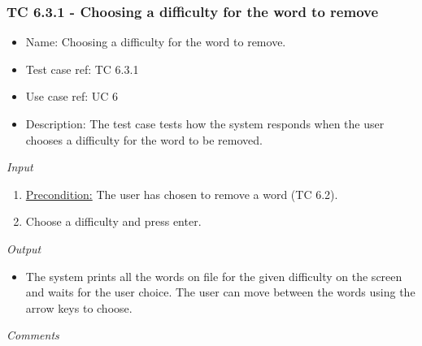 \documentclass[12pt, letterpaper]{article}
\begin{document}
\subsubsection{TC 6.3.1 - Choosing a difficulty for the word to remove}
\begin{itemize}
	\item Name: Choosing a difficulty for the word to remove.
	\item Test case ref: TC 6.3.1
	\item Use case ref: UC 6
	\item Description: The test case tests how the system responds when the user chooses a difficulty for the word to be removed.
\end{itemize}
\emph{Input}
\begin{enumerate}
	\item \underline{Precondition:} The user has chosen to remove a word (TC 6.2).
	\item Choose a difficulty and press enter.
\end{enumerate}
\emph{Output}
\begin{itemize}
	\item The system prints all the words on file for the given difficulty on the screen and waits for the user choice. The user can move between the words using the arrow keys to choose.
\end{itemize}
\begin{Form}
	\newline
	\newline
\end{Form}
\newline
\emph{Comments}
\newline
\newline
\newline
\newline
\newline
\newline
\newline
\end{document}
